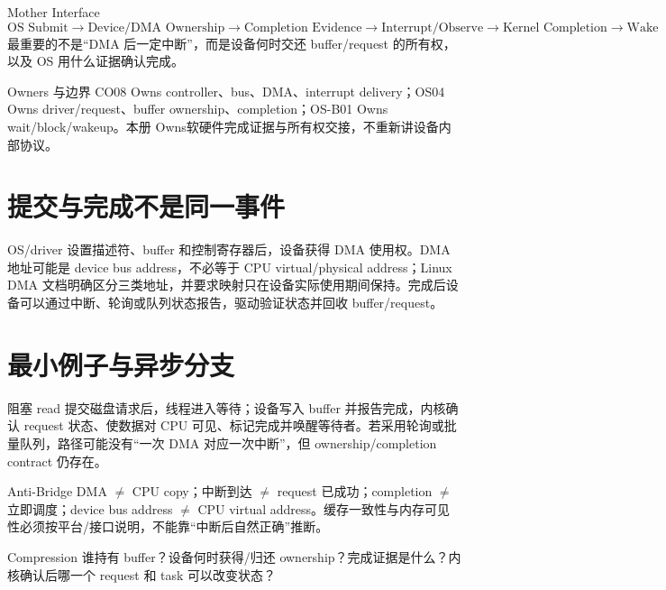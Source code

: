 \documentclass[UTF8,fontset=none,11pt,a4paper]{ctexart}
\begin{document}
\begin{corebox}{Mother Interface}
\[
\boxed{\text{OS Submit}\to\text{Device/DMA Ownership}\to\text{Completion Evidence}\to\text{Interrupt/Observe}\to\text{Kernel Completion}\to\text{Wake}}
\]
最重要的不是“DMA 后一定中断”，而是设备何时交还 buffer/request 的所有权，以及 OS 用什么证据确认完成。
\end{corebox}
\begin{methodbox}{Owners 与边界}
CO08 Owns controller、bus、DMA、interrupt delivery；OS04 Owns driver/request、buffer ownership、completion；OS-B01 Owns wait/block/wakeup。本册 Owns软硬件完成证据与所有权交接，不重新讲设备内部协议。
\end{methodbox}
\section{提交与完成不是同一事件}
OS/driver 设置描述符、buffer 和控制寄存器后，设备获得 DMA 使用权。DMA 地址可能是 device bus address，不必等于 CPU virtual/physical address；Linux DMA 文档明确区分三类地址，并要求映射只在设备实际使用期间保持。完成后设备可以通过中断、轮询或队列状态报告，驱动验证状态并回收 buffer/request。
\section{最小例子与异步分支}
阻塞 read 提交磁盘请求后，线程进入等待；设备写入 buffer 并报告完成，内核确认 request 状态、使数据对 CPU 可见、标记完成并唤醒等待者。若采用轮询或批量队列，路径可能没有“一次 DMA 对应一次中断”，但 ownership/completion contract 仍存在。
\begin{warnbox}{Anti-Bridge}
DMA $\neq$ CPU copy；中断到达 $\neq$ request 已成功；completion $\neq$ 立即调度；device bus address $\neq$ CPU virtual address。缓存一致性与内存可见性必须按平台/接口说明，不能靠“中断后自然正确”推断。
\end{warnbox}
\begin{corebox}{Compression}
谁持有 buffer？设备何时获得/归还 ownership？完成证据是什么？内核确认后哪一个 request 和 task 可以改变状态？
\end{corebox}
\end{document}
